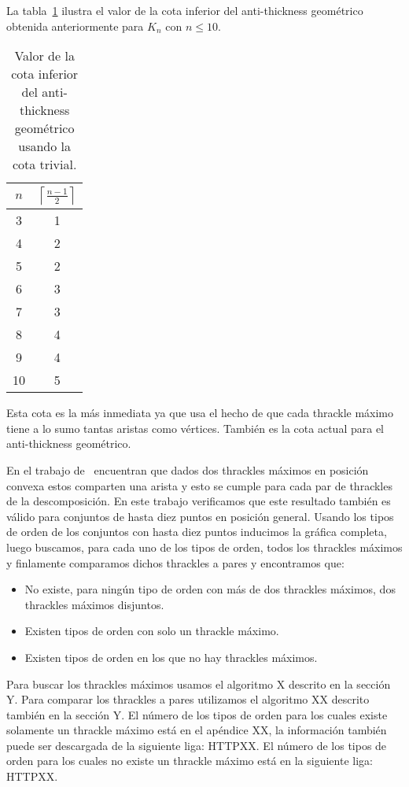 La tabla~\ref{table:attrivialinf} ilustra el valor de la cota inferior del anti-thickness
geométrico obtenida anteriormente para $K_n$ con $n\leq 10$.
\begin{table}[t]
  \centering
  \begin{tabular}{|c|c|}
    \hline
    $n$ & $\left\lceil\frac{n-1}{2}\right\rceil$ \\[5pt] \hline\hline
    3   & 1  \\
    4   & 2  \\
    5   & 2  \\
    6   & 3  \\
    7   & 3  \\
    8   & 4  \\
    9   & 4  \\
    10  & 5  \\ \hline
  \end{tabular}
  \caption{ Valor de la cota inferior del anti-thickness geométrico usando la cota trivial. }
  \label{table:attrivialinf}
\end{table}
Esta cota es la más inmediata ya que usa el hecho de que cada thrackle máximo tiene a lo
sumo tantas aristas como vértices. También es la cota actual para el anti-thickness geométrico.

En el trabajo de~\cite{Fabila-Monroy2018} encuentran que dados dos thrackles
máximos en posición convexa estos comparten una arista y esto se cumple para
cada par de thrackles de la descomposición.
En este trabajo verificamos que este resultado también es válido para conjuntos de
hasta diez puntos en posición general. Usando los tipos de orden de los conjuntos
con hasta diez puntos inducimos la gráfica completa, luego buscamos, para
cada uno de los tipos de orden, todos los thrackles máximos y
finlamente comparamos dichos thrackles a pares y encontramos que:
\begin{itemize}
  \item No existe, para ningún tipo de orden con más de dos thrackles máximos, dos thrackles máximos disjuntos.
  \item Existen tipos de orden con solo un thrackle máximo.
  \item Existen tipos de orden en los que no hay thrackles máximos.
\end{itemize}

Para buscar los thrackles máximos usamos el algoritmo X descrito en la sección Y.
Para comparar los thrackles a pares utilizamos el algoritmo XX descrito también en la sección Y.
El número de los tipos de orden para los cuales existe solamente un thrackle máximo está
en el apéndice XX, la información también puede ser descargada de la siguiente liga: HTTPXX.
El número de los tipos de orden para los cuales no existe un thrackle máximo está en la
siguiente liga: HTTPXX.

